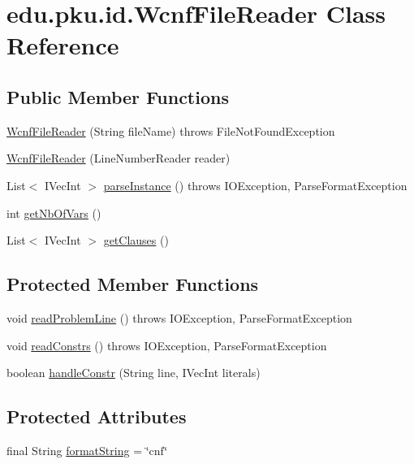 \hypertarget{classedu_1_1pku_1_1id_1_1_wcnf_file_reader}{
\section{edu.pku.id.WcnfFileReader Class Reference}
\label{classedu_1_1pku_1_1id_1_1_wcnf_file_reader}
}
\subsection*{Public Member Functions}
\begin{DoxyCompactItemize}
\item 
\hyperlink{classedu_1_1pku_1_1id_1_1_wcnf_file_reader_aacb4b0504017a967d2d30cd9090b1aee}{WcnfFileReader} (String fileName)  throws FileNotFoundException 
\item 
\hyperlink{classedu_1_1pku_1_1id_1_1_wcnf_file_reader_a232a715a8c8a9620a51000847f3eff33}{WcnfFileReader} (LineNumberReader reader)
\item 
List$<$ IVecInt $>$ \hyperlink{classedu_1_1pku_1_1id_1_1_wcnf_file_reader_a53032e479f43c9d404e6f7a4b20c5e54}{parseInstance} ()  throws IOException, ParseFormatException 
\item 
int \hyperlink{classedu_1_1pku_1_1id_1_1_wcnf_file_reader_a2252902985049c6ddfa0fac3ddc9ad09}{getNbOfVars} ()
\item 
List$<$ IVecInt $>$ \hyperlink{classedu_1_1pku_1_1id_1_1_wcnf_file_reader_a74abc19fc0d4dfecb39b0d3435e0c4fe}{getClauses} ()
\end{DoxyCompactItemize}
\subsection*{Protected Member Functions}
\begin{DoxyCompactItemize}
\item 
void \hyperlink{classedu_1_1pku_1_1id_1_1_wcnf_file_reader_a993c6cddf85a8b478953d5ba738b89a4}{readProblemLine} ()  throws IOException, ParseFormatException 
\item 
void \hyperlink{classedu_1_1pku_1_1id_1_1_wcnf_file_reader_acbdb90450d02bb72edf9c905c3a7ebec}{readConstrs} ()  throws IOException, ParseFormatException 
\item 
boolean \hyperlink{classedu_1_1pku_1_1id_1_1_wcnf_file_reader_a26ea542d17c9ff98329a36fc892726bc}{handleConstr} (String line, IVecInt literals)
\end{DoxyCompactItemize}
\subsection*{Protected Attributes}
\begin{DoxyCompactItemize}
\item 
final String \hyperlink{classedu_1_1pku_1_1id_1_1_wcnf_file_reader_a7663ee8090173a9af8dd25e5a5450f38}{formatString} = \char`\"{}cnf\char`\"{}
\end{DoxyCompactItemize}
